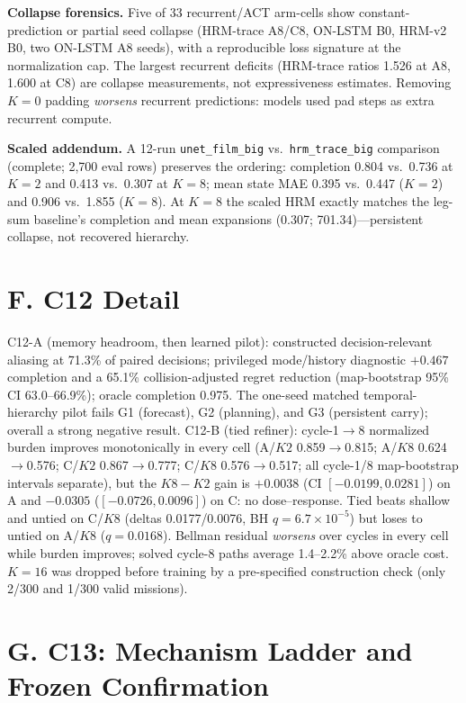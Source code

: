 \documentclass[letterpaper]{article} %
\newcommand{\stage}[1]{\textsc{#1}}
\begin{document}
\textbf{Collapse forensics.} Five of 33 recurrent/ACT arm-cells show constant-prediction or partial seed collapse (HRM-trace A8/C8, ON-LSTM B0, HRM-v2 B0, two ON-LSTM A8 seeds), with a reproducible loss signature at the normalization cap. The largest recurrent deficits (HRM-trace ratios 1.526 at A8, 1.600 at C8) are collapse measurements, not expressiveness estimates. Removing $K{=}0$ padding \emph{worsens} recurrent predictions: models used pad steps as extra recurrent compute.

\textbf{Scaled addendum.} A 12-run \texttt{unet\_film\_big} vs.\ \texttt{hrm\_trace\_big} comparison (complete; 2{,}700 eval rows) preserves the ordering: completion 0.804 vs.\ 0.736 at $K{=}2$ and 0.413 vs.\ 0.307 at $K{=}8$; mean state MAE 0.395 vs.\ 0.447 ($K{=}2$) and 0.906 vs.\ 1.855 ($K{=}8$). At $K{=}8$ the scaled HRM exactly matches the leg-sum baseline's completion and mean expansions (0.307; 701.34)---persistent collapse, not recovered hierarchy.

\section{F. \stage{C12} Detail}

\stage{C12-A} (memory headroom, then learned pilot): constructed decision-relevant aliasing at 71.3\% of paired decisions; privileged mode/history diagnostic $+0.467$ completion and a 65.1\% collision-adjusted regret reduction (map-bootstrap 95\% CI 63.0--66.9\%); oracle completion 0.975. The one-seed matched temporal-hierarchy pilot fails G1 (forecast), G2 (planning), and G3 (persistent carry); overall a strong negative result. \stage{C12-B} (tied refiner): cycle-1$\to$8 normalized burden improves monotonically in every cell (A/$K2$ 0.859$\to$0.815; A/$K8$ 0.624$\to$0.576; C/$K2$ 0.867$\to$0.777; C/$K8$ 0.576$\to$0.517; all cycle-1/8 map-bootstrap intervals separate), but the $K8{-}K2$ gain is $+0.0038$ (CI $[-0.0199, 0.0281]$) on A and $-0.0305$ ($[-0.0726, 0.0096]$) on C: no dose--response. Tied beats shallow and untied on C/$K8$ (deltas 0.0177/0.0076, BH $q{=}6.7{\times}10^{-5}$) but loses to untied on A/$K8$ ($q{=}0.0168$). Bellman residual \emph{worsens} over cycles in every cell while burden improves; solved cycle-8 paths average 1.4--2.2\% above oracle cost. $K{=}16$ was dropped before training by a pre-specified construction check (only 2/300 and 1/300 valid missions).

\section{G. C13: Mechanism Ladder and Frozen Confirmation}
\end{document}
